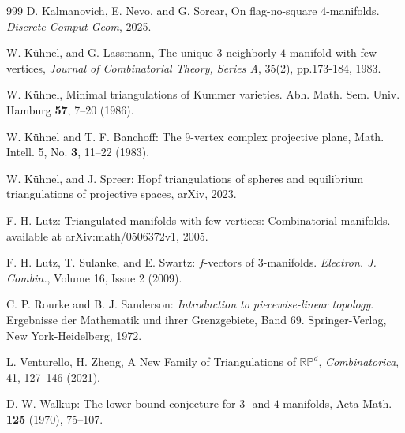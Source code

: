 \documentclass[11pt]{amsart}
\numberwithin{equation}{section}
\theoremstyle{definition}
\begin{document}
\begin{thebibliography}{999}
 D. Kalmanovich,  E. Nevo, and G. Sorcar,
 On flag-no-square $4$-manifolds.  {\em Discrete Comput Geom}, 2025.

W. Kühnel, and  G. Lassmann,  The unique $3$-neighborly $4$-manifold with few vertices, {\em Journal of Combinatorial Theory, Series A}, 35(2), pp.173-184, 1983.

 W. K\"{u}hnel,
 Minimal triangulations of Kummer varieties.
 Abh. Math. Sem. Univ. Hamburg {\bf 57}, 7--20 (1986).

 W. K\"{u}hnel and T. F. Banchoff:
 The 9-vertex complex projective plane,
 Math. Intell. 5, No. {\bf 3}, 11--22 (1983).

W. K\"{u}hnel, and J. Spreer: Hopf triangulations of spheres and equilibrium triangulations of projective spaces, arXiv, 2023.


 F. H. Lutz:
 Triangulated manifolds with few vertices: Combinatorial manifolds.
 available at arXiv:math/0506372v1, 2005.

 F. H. Lutz, T. Sulanke, and E. Swartz:
 $f$-vectors of $3$-manifolds.
 {\em Electron. J. Combin.}, Volume 16, Issue 2 (2009).

 C. P. Rourke and B. J. Sanderson:
 {\it Introduction to piecewise-linear topology}.
 Ergebnisse der Mathematik und ihrer Grenzgebiete, Band 69.
 Springer-Verlag, New York-Heidelberg, 1972.

L. Venturello, H. Zheng,  A New Family of Triangulations of $\mathbb{RP}^d$, {\em Combinatorica}, 41, 127–146 (2021). 

 D. W. Walkup:
 The lower bound conjecture for $3$- and $4$-manifolds,
 Acta Math. {\bf 125} (1970), 75--107.

\end{thebibliography}
\end{document}
